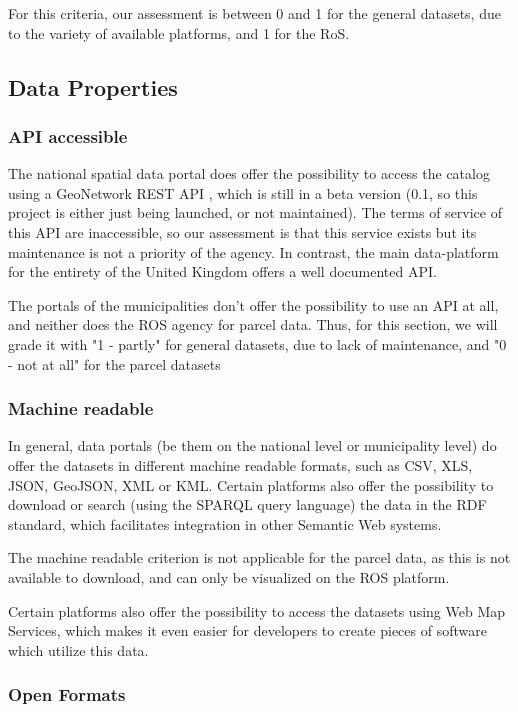 For this criteria, our assessment is between 0 and 1 for the general datasets, due to the variety of available platforms, and 1 for the RoS.

\subsection{Data Properties} %

\subsubsection{API accessible} %

The national spatial data portal does offer the possibility to access the catalog using a GeoNetwork REST API \citep{ssdi_api}, which is still in a beta version (0.1, so this project is either just being launched, or not maintained). The terms of service of this API are inaccessible, so our assessment is that this service exists but its maintenance is not a priority of the agency. In contrast, the main data-platform for the entirety of the United Kingdom offers a well documented API.

The portals of the municipalities don't offer the possibility to use an API at all, and neither does the ROS agency for parcel data. Thus, for this section, we will grade it with "1 - partly" for general datasets, due to lack of maintenance, and "0 - not at all" for the parcel datasets

\subsubsection{Machine readable} %

In general, data portals (be them on the national level or municipality level) do offer the datasets in different machine readable formats, such as CSV, XLS, JSON, GeoJSON, XML or KML. Certain platforms also offer the possibility to download or search (using the SPARQL query language) the data in the RDF standard, which facilitates integration in other Semantic Web systems.

The machine readable criterion is not applicable for the parcel data, as this is not available to download, and can only be visualized on the ROS platform.

Certain platforms also offer the possibility to access the datasets using Web Map Services, which makes it even easier for developers to create pieces of software which utilize this data.

\subsubsection{Open Formats} %

